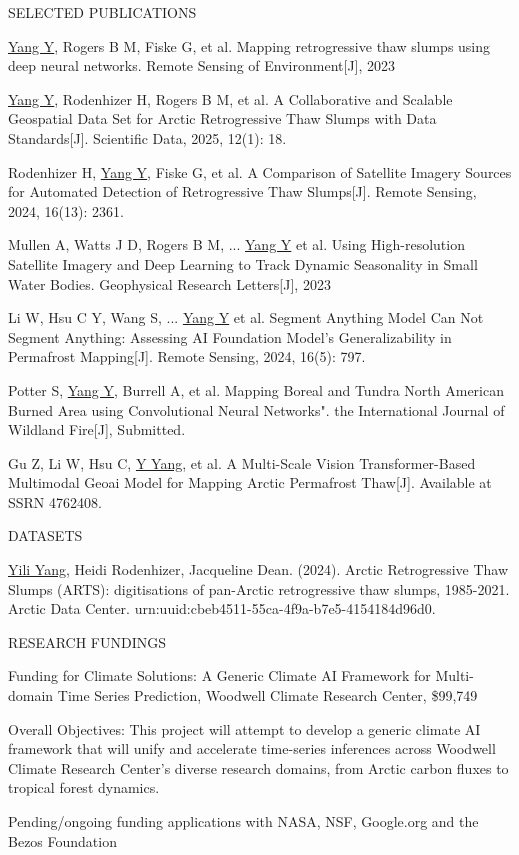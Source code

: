 \documentclass{resume} %
\begin{document}
\begin{rSection}{SELECTED PUBLICATIONS}

\underline{Yang Y}, Rogers B M, Fiske G, et al. Mapping retrogressive thaw slumps using deep neural networks. Remote Sensing of Environment[J], 2023

\underline{Yang Y}, Rodenhizer H, Rogers B M, et al. A Collaborative and Scalable Geospatial Data Set for Arctic Retrogressive Thaw Slumps with Data Standards[J]. Scientific Data, 2025, 12(1): 18.

Rodenhizer H, \underline{Yang Y}, Fiske G, et al. A Comparison of Satellite Imagery Sources for Automated Detection of Retrogressive Thaw Slumps[J]. Remote Sensing, 2024, 16(13): 2361.

Mullen A, Watts J D, Rogers B M, ... \underline{Yang Y} et al. Using High-resolution Satellite Imagery and Deep Learning to Track Dynamic Seasonality in Small Water Bodies. Geophysical Research Letters[J], 2023

Li W, Hsu C Y, Wang S, ... \underline{Yang Y} et al. Segment Anything Model Can Not Segment Anything: Assessing AI Foundation Model’s Generalizability in Permafrost Mapping[J]. Remote Sensing, 2024, 16(5): 797.

Potter S, \underline{Yang Y}, Burrell A, et al. Mapping Boreal and Tundra North American Burned Area using Convolutional Neural Networks". the International Journal of Wildland Fire[J], Submitted.

Gu Z, Li W, Hsu C, \underline{Y Yang}, et al. A Multi-Scale Vision Transformer-Based Multimodal Geoai Model for Mapping Arctic Permafrost Thaw[J]. Available at SSRN 4762408.


\end{rSection}
\begin{rSection}{DATASETS}

\underline{Yili Yang}, Heidi Rodenhizer, Jacqueline Dean. (2024). Arctic Retrogressive Thaw Slumps (ARTS): digitisations of pan-Arctic retrogressive thaw slumps, 1985-2021. Arctic Data Center. urn:uuid:cbeb4511-55ca-4f9a-b7e5-4154184d96d0.

\end{rSection}
\begin{rSection}{RESEARCH FUNDINGS}

Funding for Climate Solutions: A Generic Climate AI Framework for Multi-domain Time Series Prediction, Woodwell Climate Research Center, \$99,749
    
Overall Objectives: This project will attempt to develop a generic climate AI framework that will unify and accelerate time-series inferences across Woodwell Climate Research Center's diverse research domains, from Arctic carbon fluxes to tropical forest dynamics.

Pending/ongoing funding applications with NASA, NSF, Google.org and the Bezos Foundation
    
\end{rSection}
\end{document}
